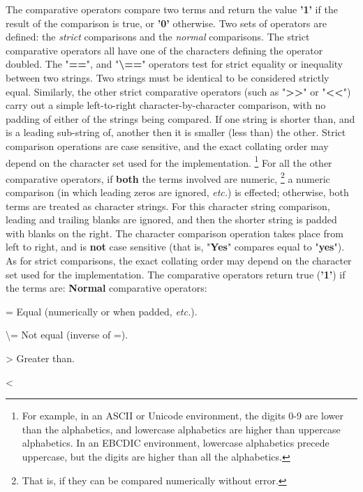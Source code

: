 \begin{description}
The comparative operators compare two terms and return the
value \textbf{'1'} if the result of the comparison is true,
or \textbf{'0'} otherwise.  Two sets of operators are defined: the
\emph{strict} comparisons and the \emph{normal} comparisons.
 The strict comparative operators all have one of the characters
defining the operator doubled.  The "\textbf{==}",
and "\textbf{\textbackslash ==}" operators
test for strict equality or inequality between two strings.
Two strings must be identical to be considered strictly equal.
Similarly, the other strict comparative operators (such as
"\textbf{>>}" or "\textbf{<<}") carry out a simple
left-to-right character-by-character comparison, with no padding of
either of the strings being compared.
If one string is shorter than, and is a leading sub-string of, another
then it is smaller (less than) the other.
Strict comparison operations are case sensitive, and the exact collating
order may depend on the character set used for the implementation.
\footnote{
For example, in an ASCII or Unicode environment, the digits 0-9
are lower than the alphabetics, and lowercase alphabetics are higher
than uppercase alphabetics.
In an EBCDIC environment, lowercase alphabetics precede uppercase, but
the digits are higher than all the alphabetics.
}
 For all the other comparative operators, if \textbf{both} the
terms involved are numeric,
\footnote{
That is, if they can be compared numerically without error.
}
a numeric comparison (in which leading zeros are ignored,
\emph{etc.}) is effected; otherwise, both terms are treated as character
strings.
For this character string comparison, leading and trailing blanks are
ignored, and then the shorter string is padded with blanks on the right.
The character comparison operation takes place from left to right, and
is \textbf{not} case sensitive (that is, "\textbf{Yes}"
compares equal to "\textbf{yes}").
As for strict comparisons, the exact collating order may depend on the
character set used for the implementation.
 The comparative operators return true (\textbf{'1'}) if the terms
are:
 \textbf{Normal} comparative operators:
\begin{description}
\index{,}
\index{,}
\index{,}
\index{,}
\index{,}
\index{,}
\index{,}
\index{,}
\index{,}
\item{=}
Equal (numerically or when padded, \emph{etc.}).
\item{\textbackslash =}
Not equal (inverse of =).
\item{>}
Greater than.
\item{<}

\end{description}
\end{description}
